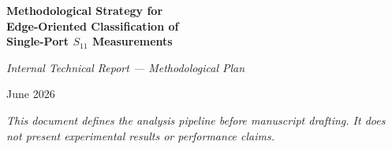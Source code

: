 \documentclass[11pt,a4paper]{article}
\begin{document}
\begin{titlepage}
  \centering
  \vspace*{3cm}

  {\Huge\bfseries Methodological Strategy for\\[0.3em]
   Edge-Oriented Classification of\\[0.3em]
   Single-Port $S_{11}$ Measurements\par}

  \vspace{1.5cm}

  {\Large\itshape Internal Technical Report --- Methodological Plan\par}

  \vspace{2cm}

  {\large June 2026\par}

  \vfill

  \begin{minipage}{0.75\textwidth}
    \centering
    \small\itshape
    This document defines the analysis pipeline before manuscript drafting.
    It does not present experimental results or performance claims.
  \end{minipage}

  \vspace{2cm}
\end{titlepage}

\tableofcontents
\clearpage
\listoftables
\listoffigures
\clearpage
{}










\clearpage


\end{document}
